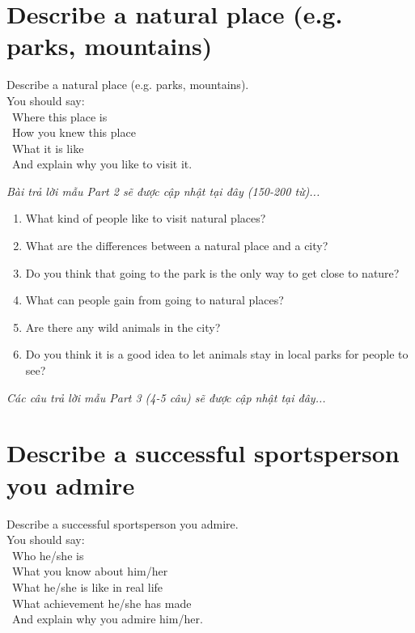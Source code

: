 \section{Describe a natural place (e.g. parks, mountains)}
\begin{ieltsprompt}
Describe a natural place (e.g. parks, mountains). \\
You should say: \\
\textbullet\ Where this place is \\
\textbullet\ How you knew this place \\
\textbullet\ What it is like \\
\textbullet\ And explain why you like to visit it. \\
\end{ieltsprompt}

\vspace{1em}
\textit{Bài trả lời mẫu Part 2 sẽ được cập nhật tại đây (150-200 từ)...}
\vspace{2em}

\begin{ieltsprompt}
\begin{enumerate}[itemsep=4pt]
    \item What kind of people like to visit natural places?
    \item What are the differences between a natural place and a city?
    \item Do you think that going to the park is the only way to get close to nature?
    \item What can people gain from going to natural places?
    \item Are there any wild animals in the city?
    \item Do you think it is a good idea to let animals stay in local parks for people to see?
\end{enumerate}
\end{ieltsprompt}

\vspace{1em}
\textit{Các câu trả lời mẫu Part 3 (4-5 câu) sẽ được cập nhật tại đây...}
\vspace{2em}

\section{Describe a successful sportsperson you admire}
\begin{ieltsprompt}
Describe a successful sportsperson you admire. \\
You should say: \\
\textbullet\ Who he/she is \\
\textbullet\ What you know about him/her \\
\textbullet\ What he/she is like in real life \\
\textbullet\ What achievement he/she has made \\
\textbullet\ And explain why you admire him/her. \\
\end{ieltsprompt}

